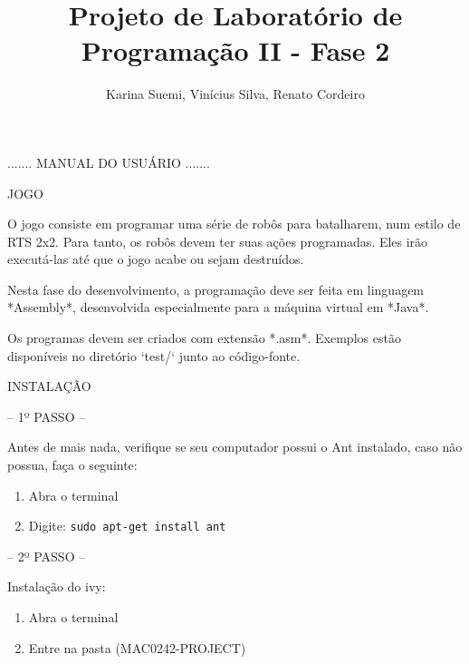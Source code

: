 \documentclass[a4paper]{article}
\title  {Projeto de Laboratório de Programação II - Fase 2}
\author {Karina Suemi, Vinícius Silva, Renato Cordeiro}
\date   {}
\begin{document}
\maketitle

\bigskip
\bigskip
\bigskip
\bigskip

{\textcolor{NavyBlue}{\Huge{....... MANUAL DO USUÁRIO .......}}


\newpage

     
{\textcolor{NavyBlue}{\LARGE JOGO }

\bigskip

O  jogo consiste  em programar uma  série de 
robôs para batalharem, num estilo de RTS 2x2.
Para  tanto,  os robôs devem  ter suas ações 
programadas. Eles irão executá-las até que o 
jogo acabe ou sejam destruídos.

Nesta fase do desenvolvimento, a programação 
deve  ser  feita   em  linguagem  *Assembly*,
desenvolvida  especialmente  para  a máquina 
virtual  em *Java*. 

Os programas devem  ser criados com extensão 
*.asm*.   Exemplos   estão   disponíveis  no 
diretório `test/` junto ao código-fonte. 



\bigskip
\bigskip
\bigskip
\bigskip


{\textcolor{NavyBlue}{\LARGE INSTALAÇÃO }
                
\bigskip
                                            
\textcolor{NavyBlue}{-- 1º PASSO --}

Antes de mais nada, verifique se seu computador possui
o Ant instalado, caso não possua, faça o seguinte:

\begin{enumerate}
	\item Abra o terminal

    \item Digite: \texttt{sudo apt-get install ant}
\end{enumerate}

\bigskip



\textcolor{NavyBlue}{-- 2º PASSO --}

Instalação do ivy:

\begin{enumerate}
	\item Abra o terminal

	\item Entre na pasta (MAC0242-PROJECT)


\end{enumerate}}}}
\end{document}
